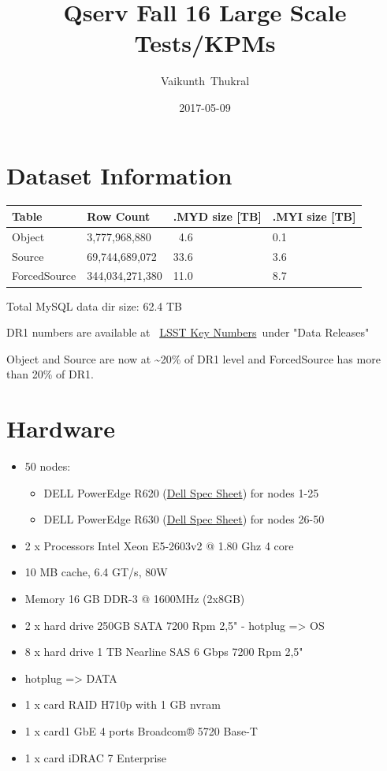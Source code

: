 \documentclass[DM,toc]{lsstdoc}
\title[Qserv Test Fall 2016]{Qserv Fall 16 Large Scale Tests/KPMs}
\author{Vaikunth~Thukral}
\date{2017-05-09}
\begin{document}
\maketitle

\section{Dataset Information}\label{dataset-information}

\begin{longtable}[]{@{}llll@{}}
\toprule
\textbf{Table} & \textbf{Row Count} & \textbf{.MYD size {[}TB{]}} &
\textbf{.MYI size {[}TB{]}}\tabularnewline
\midrule
\endhead
Object & 3,777,968,880 & ~4.6 & 0.1\tabularnewline
Source & 69,744,689,072 & 33.6 & 3.6\tabularnewline
ForcedSource & 344,034,271,380 & 11.0 & 8.7\tabularnewline
\bottomrule
\end{longtable}

Total MySQL data dir size: 62.4 TB

DR1 numbers are available at~
\href{https://www.lsst.org/scientists/keynumbers}{LSST Key
Numbers}~under "Data Releases"

Object and Source are now at \textasciitilde{}20\% of DR1 level and
ForcedSource has more than 20\% of DR1.

\section{Hardware}\label{hardware}

\begin{itemize}
\item
  50 nodes:

  \begin{itemize}
  \item
    DELL PowerEdge R620
    (\href{http://www.dell.com/downloads/global/products/pedge/en/Dell_PowerEdge_R620_Spec_Sheet.pdf}{Dell
    Spec Sheet}) for nodes 1-25
  \item
    DELL PowerEdge R630
    (\href{http://i.dell.com/sites/doccontent/shared-content/data-sheets/en/Documents/Dell-PowerEdge-R630-Spec-Sheet.pdf}{Dell
    Spec Sheet}) for nodes 26-50
  \end{itemize}
\item
  2 x Processors Intel Xeon E5-2603v2 @ 1.80 Ghz 4 core
\item
  10 MB cache, 6.4 GT/s, 80W
\item
  Memory 16 GB DDR-3 @ 1600MHz (2x8GB)
\item
  2 x hard drive 250GB SATA 7200 Rpm 2,5" - hotplug =\textgreater{} OS
\item
  8 x hard drive 1 TB Nearline SAS 6 Gbps 7200 Rpm 2,5"
\item
  hotplug =\textgreater{} DATA
\item
  1 x card RAID H710p with 1 GB nvram
\item
  1 x card1 GbE 4 ports Broadcom® 5720 Base-T
\item
  1 x card iDRAC 7 Enterprise
\end{itemize}
\end{document}
